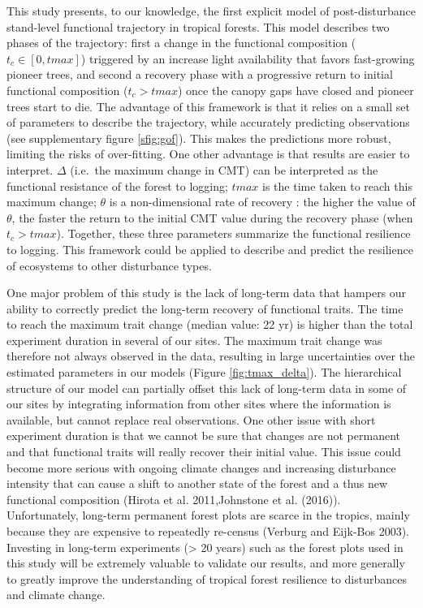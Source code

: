 \documentclass[]{elsarticle} %
\begin{document}
This study presents, to our knowledge, the first explicit model of
post-disturbance stand-level functional trajectory in tropical forests.
This model describes two phases of the trajectory: first a change in the
functional composition (\(t_c \in [0,tmax]\)) triggered by an increase
light availability that favors fast-growing pioneer trees, and second a
recovery phase with a progressive return to initial functional
composition (\(t_c > tmax\)) once the canopy gaps have closed and
pioneer trees start to die. The advantage of this framework is that it
relies on a small set of parameters to describe the trajectory, while
accurately predicting observations (see supplementary figure
\ref{sfig:gof}). This makes the predictions more robust, limiting the
risks of over-fitting. One other advantage is that results are easier to
interpret. \(\Delta\) (i.e.~the maximum change in CMT) can be
interpreted as the functional resistance of the forest to logging;
\(tmax\) is the time taken to reach this maximum change; \(\theta\) is a
non-dimensional rate of recovery : the higher the value of \(\theta\),
the faster the return to the initial CMT value during the recovery phase
(when \(t_c > tmax\)). Together, these three parameters summarize the
functional resilience to logging. This framework could be applied to
describe and predict the resilience of ecosystems to other disturbance
types.

One major problem of this study is the lack of long-term data that
hampers our ability to correctly predict the long-term recovery of
functional traits. The time to reach the maximum trait change (median
value: 22 yr) is higher than the total experiment duration in several of
our sites. The maximum trait change was therefore not always observed in
the data, resulting in large uncertainties over the estimated parameters
in our models (Figure \ref{fig:tmax_delta}). The hierarchical structure
of our model can partially offset this lack of long-term data in some of
our sites by integrating information from other sites where the
information is available, but cannot replace real observations. One
other issue with short experiment duration is that we cannot be sure
that changes are not permanent and that functional traits will really
recover their initial value. This issue could become more serious with
ongoing climate changes and increasing disturbance intensity that can
cause a shift to another state of the forest and a thus new functional
composition (Hirota et al. 2011,Johnstone et al. (2016)). Unfortunately,
long-term permanent forest plots are scarce in the tropics, mainly
because they are expensive to repeatedly re-census (Verburg and Eijk-Bos
2003). Investing in long-term experiments (\textgreater{} 20 years) such
as the forest plots used in this study will be extremely valuable to
validate our results, and more generally to greatly improve the
understanding of tropical forest resilience to disturbances and climate
change.
\end{document}
